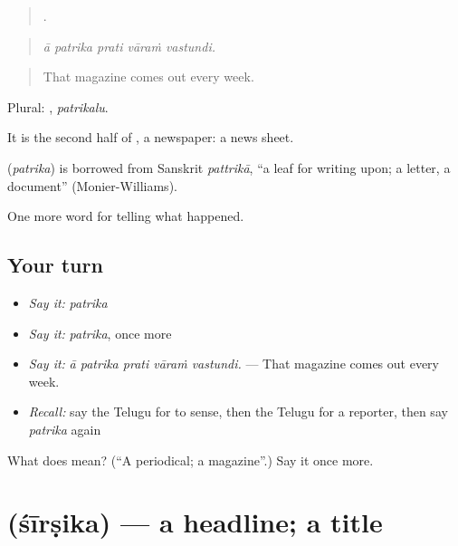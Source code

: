 \begin{quote}
    .
\end{quote}

\begin{quote}
\emph{ā patrika prati vāraṁ vastundi.}
\end{quote}

\begin{quote}
That magazine comes out every week.
\end{quote}

Plural: , \emph{patrikalu}.

It is the second half of , a newspaper: a news sheet.

\begin{cousinweb}
\textbf{} (\emph{patrika}) is borrowed from Sanskrit \emph{pattrikā}, \textquotedblleft{}a leaf for writing upon; a letter, a document\textquotedblright{} (Monier-Williams).
\end{cousinweb}

\begin{grammarlens}[title={What you've built}]
One more word for telling what happened.
\end{grammarlens}

\subsection*{Your turn}
\begin{itemize}
\raggedright
  \item \emph{Say it:} \emph{patrika}
  \item \emph{Say it:} \emph{patrika}, once more
  \item \emph{Say it:} \emph{ā patrika prati vāraṁ vastundi.} — That magazine comes out every week.
  \item \emph{Recall:} say the Telugu for to sense, then the Telugu for a reporter, then say \emph{patrika} again
\end{itemize}

\begin{tcolorbox}[breakable,colback=teal!4,colframe=teal!35!black,title={Before you move on}]
What does  mean? (\textquotedblleft{}A periodical; a magazine\textquotedblright{}.) Say it once more.
\end{tcolorbox}
\section[\texorpdfstring{\te{శీర్షిక} (śīrṣika)}{శీర్షిక (śīrṣika)}]{ (śīrṣika) — a headline; a title}

